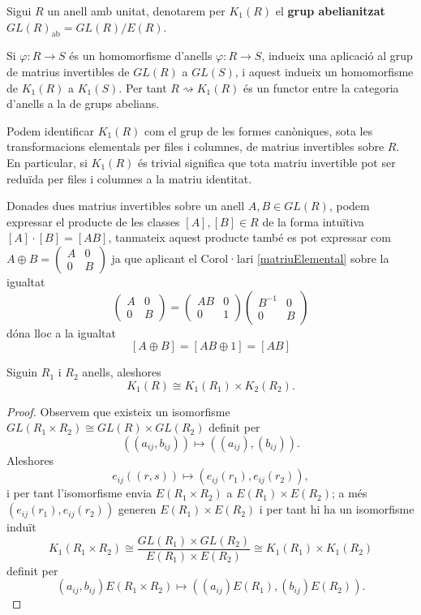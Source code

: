 \begin{definition}
Sigui $R$ un anell amb unitat, denotarem per $K_1(R)$ el \textbf{grup abelianitzat} $GL(R)_\text{ab}=GL(R)/E(R)$. 
\end{definition}

\begin{obs}
Si $\varphi : R\rightarrow S$ és un homomorfisme d'anells $\varphi : R\rightarrow S$, indueix una aplicació al grup de matrius invertibles de $GL(R)$ a $GL(S)$, i aquest indueix un homomorfisme de $K_1(R)$ a $K_1(S)$. Per tant $R\rightsquigarrow K_1(R)$ és un functor entre la categoria d'anells a la de grups abelians.
\end{obs}

Podem identificar $K_1(R)$ com el grup de les formes canòniques, sota les transformacions elementals per files i columnes, de matrius invertibles sobre $R$. En particular, si $K_1(R)$ és trivial significa que tota matriu invertible pot ser reduïda per files i columnes a la matriu identitat.

\begin{obs}
Donades dues matrius invertibles sobre un anell $A,B\in GL(R)$, podem expressar el producte de les classes $[A],[B]\in R$ de la forma intuïtiva $[A]\cdot [B] = [AB]$, tanmateix aquest producte també es pot expressar com 
$A\oplus B =
 \left( \begin{matrix}
  A & 0 \\
  0 & B
 \end{matrix} \right)
$
ja que aplicant el Corol·lari \ref{matriuElemental} sobre la igualtat
$$
\left( \begin{matrix}
  A & 0 \\
  0 & B
 \end{matrix} \right) =  
 \left( \begin{matrix}
  AB & 0 \\
  0 & 1
 \end{matrix} \right)
 \left( \begin{matrix}
  B^{-1} & 0 \\
  0 & B
 \end{matrix} \right)
 $$
dóna lloc a la igualtat
$$
[A\oplus B] = [AB\oplus 1] = [AB]
$$
 \end{obs}

\begin{prop} \label{K1Cartesian}
Siguin $R_1$ i $R_2$ anells, aleshores 
$$
K_1(R)\cong K_1(R_1) \times K_2(R_2).
$$
\end{prop}
\begin{proof}
Observem que existeix un isomorfisme $GL(R_1\times R_2) \cong GL(R) \times GL(R_2)$ definit per $$((a_{ij},b_{ij})) \mapsto ((a_{ij}),(b_{ij})).$$ Aleshores
$$
e_{ij}((r,s)) \mapsto (e_{ij}(r_1),  e_{ij}(r_2)),
$$
i per tant l'isomorfisme envia $E(R_1\times R_2)$ a $E(R_1)\times E(R_2)$; a més $(e_{ij}(r_1),  e_{ij}(r_2))$ generen $E(R_1)\times E(R_2)$ i per tant hi ha un isomorfisme induït
$$
K_1(R_1\times R_2) \cong \frac{GL(R_1)\times GL(R_2)}{E(R_1)\times E(R_2)} \cong K_1(R_1) \times K_1(R_2)
$$
definit per 
$$
(a_{ij},b_{ij}) E(R_1\times R_2) \mapsto ((a_{ij})E(R_1), (b_{ij})E(R_2)).
$$

\end{proof}

